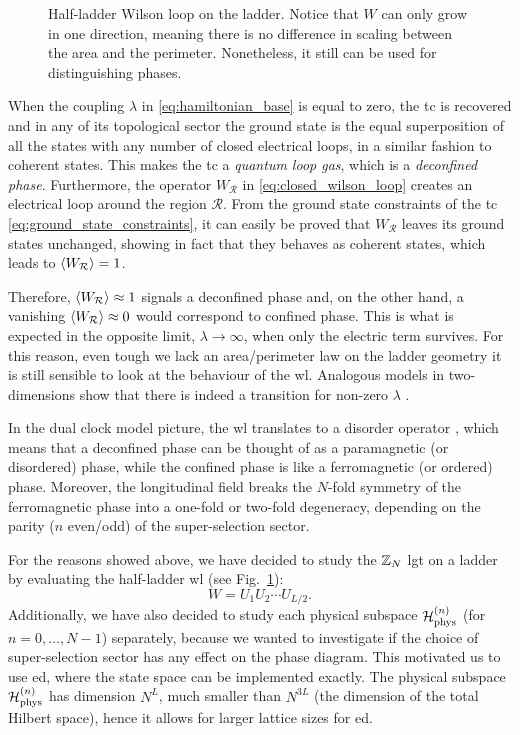 \begin{figure}[t]
    \centering
    
    \caption[Half-ladder \ac{wl} on the ladder]{%
        Half-ladder Wilson loop on the ladder.
        Notice that $W$ can only grow in one direction, meaning there is no difference in scaling between the area and the perimeter.
        Nonetheless, it still can be used for distinguishing phases.%
    }
    \label{fig:nlop_ladder}
\end{figure}


When the coupling $\lambda$ in \eqref{eq:hamiltonian_base} is equal to zero, the \ac{tc} is recovered and in any of its topological sector the ground state is the equal superposition of all the states with any number of closed electrical loops, in a similar fashion to coherent states.
This makes the \ac{tc} a \emph{quantum loop gas}, which is a \emph{deconfined phase}.
Furthermore, the operator $W_{\mathcal{R}}$ in \eqref{eq:closed_wilson_loop} creates an electrical loop around the region $\mathcal{R}$.
From the ground state constraints of the \ac{tc} \eqref{eq:ground_state_constraints},
it can easily be proved that $W_{\mathcal{R}}$ leaves its ground states unchanged, showing in fact that they behaves as coherent states, which leads to $\ev{W_{\mathcal{R}}} = 1$.

Therefore, $\ev{W_{\mathcal{R}}} \approx 1$ signals a deconfined phase and, on the other hand, a vanishing $\ev{W_{\mathcal{R}}} \approx 0$ would correspond to confined phase.
This is what is expected in the opposite limit, $\lambda \to \infty$, when only the electric term survives.
For this reason, even tough we lack an area/perimeter law on the ladder geometry it is still sensible to look at the behaviour of the \ac{wl}.
Analogous models in two-dimensions show that there is indeed a transition for non-zero $\lambda$ \cite{trebst2007topological, hamma2008adiabatic, tagliacozzo2011entanglement}.


In the dual clock model picture, the \ac{wl} translates to a disorder operator \cite{fradkin1978order}, which means that a deconfined phase can be thought of as a paramagnetic (or disordered) phase, while the confined phase is like a ferromagnetic (or ordered) phase.
Moreover, the longitudinal field breaks the $N$-fold symmetry of the ferromagnetic phase into a one-fold or two-fold degeneracy, depending on the parity ($n$ even/odd) of the super-selection sector.

For the reasons showed above, we have decided to study the $\mathbb{Z}_N$ \ac{lgt} on a ladder by evaluating the half-ladder \ac{wl} (see Fig.~\ref{fig:nlop_ladder}):
\begin{equation}
    W = U_1 U_2 \cdots U_{L/2}.
\end{equation}
Additionally, we have also decided to study each physical subspace $\mathcal{H}_{\text{phys}}^{(n)}$ (for $n=0,\dots,N-1$) separately, because we wanted to investigate if the choice of super-selection sector has any effect on the phase diagram.
This motivated us to use \ac{ed}, where the state space can be implemented exactly.
The physical subspace $\mathcal{H}_{\text{phys}}^{(n)}$ has dimension $N^L$, much smaller than $N^{3L}$ (the dimension of the total Hilbert space), hence it allows for larger lattice sizes for \ac{ed}.
